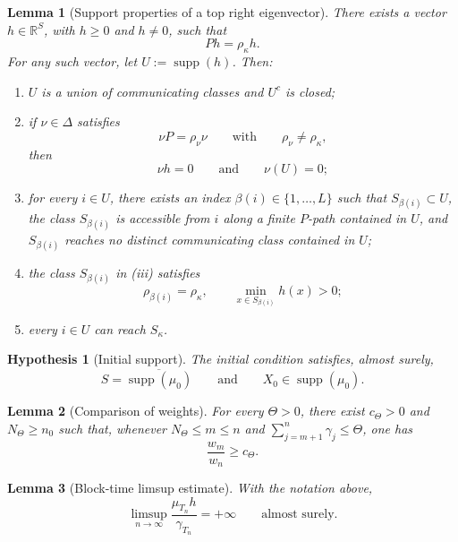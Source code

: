 \documentclass[10pt,a4paper]{amsart}
\newtheorem{hypothesis}{Hypothesis}
\newtheorem{lemma}{Lemma}
\DeclareMathOperator{\supp}{supp}
\begin{document}
\begin{lemma}[Support properties of a top right eigenvector]
\label{lem:right-perron-support}
There exists a vector \(h\in\mathbb R^S\), with \(h\geq0\) and \(h\neq0\),
such that
\[
Ph=\rho_\kappa h.
\]
For any such vector, let \(U:=\supp(h)\). Then:
\begin{enumerate}[label=\textup{(\roman*)}]
\item \(U\) is a union of communicating classes and \(U^c\) is closed;

\item if \(\nu\in\Delta\) satisfies
\[
\nu P=\rho_\nu\nu
\qquad\text{with}\qquad
\rho_\nu\neq\rho_\kappa,
\]
then
\[
\nu h=0
\qquad\text{and}\qquad
\nu(U)=0;
\]

\item for every \(i\in U\), there exists an index
\(\beta(i)\in\{1,\ldots,L\}\) such that \(S_{\beta(i)}\subset U\),
the class \(S_{\beta(i)}\) is accessible from \(i\) along a finite
\(P\)-path contained in \(U\), and \(S_{\beta(i)}\) reaches no distinct
communicating class contained in \(U\);

\item the class \(S_{\beta(i)}\) in \textup{(iii)} satisfies
\[
\rho_{\beta(i)}=\rho_\kappa,
\qquad
\min_{x\in S_{\beta(i)}}h(x)>0;
\]

\item every \(i\in U\) can reach \(S_\kappa\).
\end{enumerate}
\end{lemma}

\begin{hypothesis}[Initial support]
\label{hyp:initial-support}
The initial condition satisfies, almost surely,
\[
S=\overline{\supp(\mu_0)}
\qquad\text{and}\qquad
X_0\in\supp(\mu_0).
\]
\end{hypothesis}

\begin{lemma}[Comparison of weights]
\label{lem:controlled-window-weights}
For every \(\Theta>0\), there exist \(c_\Theta>0\) and
\(N_\Theta\geq n_0\) such that, whenever \(N_\Theta\leq m\leq n\) and
\(\sum\limits_{j=m+1}^{n}\gamma_j\leq\Theta\), one has
\[
\frac{w_m}{w_n}\geq c_\Theta.
\]
\end{lemma}

\begin{lemma}[Block-time limsup estimate]
\label{lem:block-time-limsup}
With the notation above,
\[
\limsup_{n\to\infty}
\frac{\mu_{T_n}h}{\gamma_{T_n}}
=
+\infty
\qquad\text{almost surely}.
\]
\end{lemma}
\end{document}
